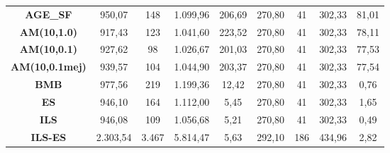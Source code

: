 \begin{table}[H]
{\begin{tabular}{ccccccccc}
\multicolumn{1}{|c|}{\textbf{AGE\_SF}} & 950,07 & 148 & 1.099,96 & \multicolumn{1}{c|}{206,69} & 270,80 & 41 & 302,33 & \multicolumn{1}{c|}{81,01} \\
\multicolumn{1}{|c|}{\textbf{AM(10,1.0)}} & 917,43 & 123 & 1.041,60 & \multicolumn{1}{c|}{223,52} & 270,80 & 41 & 302,33 & \multicolumn{1}{c|}{78,11} \\
\multicolumn{1}{|c|}{\textbf{AM(10,0.1)}} & 927,62 & 98 & 1.026,67 & \multicolumn{1}{c|}{201,03} & 270,80 & 41 & 302,33 & \multicolumn{1}{c|}{77,53} \\
\multicolumn{1}{|c|}{\textbf{AM(10,0.1mej)}} & 939,57 & 104 & 1.044,90 & \multicolumn{1}{c|}{203,37} & 270,80 & 41 & 302,33 & \multicolumn{1}{c|}{77,54} \\
\multicolumn{1}{|c|}{\textbf{BMB}} & 977,56 & 219 & 1.199,36 & \multicolumn{1}{c|}{12,42} & 270,80 & 41 & 302,33 & \multicolumn{1}{c|}{0,76} \\
\multicolumn{1}{|c|}{\textbf{ES}} & 946,10 & 164 & 1.112,00 & \multicolumn{1}{c|}{5,45} & 270,80 & 41 & 302,33 & \multicolumn{1}{c|}{1,65} \\
\multicolumn{1}{|c|}{\textbf{ILS}} & 946,08 & 109 & 1.056,68 & \multicolumn{1}{c|}{5,21} & 270,80 & 41 & 302,33 & \multicolumn{1}{c|}{0,49} \\
\multicolumn{1}{|c|}{\textbf{ILS-ES}} & 2.303,54 & 3.467 & 5.814,47 & \multicolumn{1}{c|}{5,63} & 292,10 & 186 & 434,96 & \multicolumn{1}{c|}{2,82} \\ \hline
\end{tabular}%
}
\end{table}
